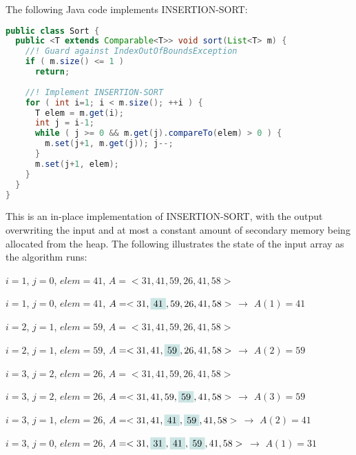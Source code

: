 \documentclass[a4paper,12pt]{article}
\begin{document}

The following Java code implements INSERTION-SORT:

\begin{lstlisting}[language=Java]
public class Sort {
  public <T extends Comparable<T>> void sort(List<T> m) {
    //! Guard against IndexOutOfBoundsException
    if ( m.size() <= 1 )
      return;
      
    //! Implement INSERTION-SORT
    for ( int i=1; i < m.size(); ++i ) {
      T elem = m.get(i);
      int j = i-1;
      while ( j >= 0 && m.get(j).compareTo(elem) > 0 ) {
        m.set(j+1, m.get(j)); j--;
      }
      m.set(j+1, elem);
    }
  }
}
\end{lstlisting}

This is an in-place implementation of INSERTION-SORT, with the output overwriting the input and at most a constant amount of secondary memory being allocated from the heap. 
The following illustrates the state of the input array as the algorithm runs:

\vspace{5mm}
$i=1$, $j=0$, $elem = 41$, $A = <31, 41, 59, 26, 41, 58>$

$i=1$, $j=0$, $elem = 41$, $A = <31, \colorbox{highlightcolor}{41}, 59, 26, 41, 58>$ $\rightarrow$ $A(1) = 41$

$i=2$, $j=1$, $elem = 59$, $A = <31, 41, 59, 26, 41, 58>$

$i=2$, $j=1$, $elem = 59$, $A = <31, 41, \colorbox{highlightcolor}{59}, 26, 41, 58>$ $\rightarrow$ $A(2) = 59$

$i=3$, $j=2$, $elem = 26$, $A = <31, 41, 59, 26, 41, 58>$ 

$i=3$, $j=2$, $elem = 26$, $A = <31, 41, 59, \colorbox{highlightcolor}{59}, 41, 58>$ $\rightarrow$ $A(3) = 59$

$i=3$, $j=1$, $elem = 26$, $A = <31, 41, \colorbox{highlightcolor}{41}, \colorbox{highlightcolor}{59}, 41, 58>$ $\rightarrow$ $A(2) = 41$
 
$i=3$, $j=0$, $elem = 26$, $A = <31,\colorbox{highlightcolor}{31}, \colorbox{highlightcolor}{41}, \colorbox{highlightcolor}{59}, 41, 58>$ $\rightarrow$  $A(1) = 31$
\end{document}
